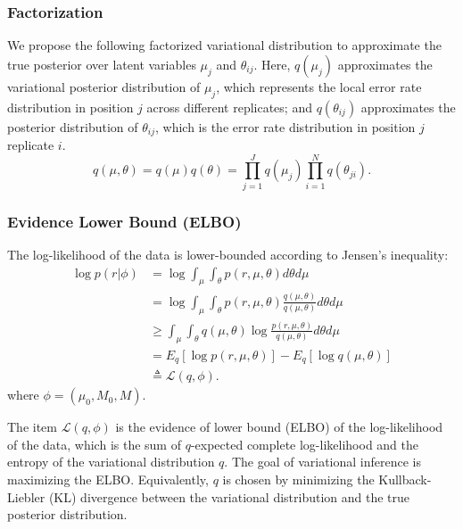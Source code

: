 \documentclass[11pt,reqno]{amsart}
\begin{document}
\subsubsection{Factorization}
We propose the following factorized variational distribution to approximate the true posterior over latent variables $\mu_j$ and $\theta_{ij}$.
Here, $q(\mu_j)$ approximates the variational posterior distribution of $\mu_j$, which represents the local error rate distribution in position $j$ across different replicates;
and $q(\theta_{ij})$ approximates the posterior distribution of $\theta_{ij}$, which is the error rate distribution in position $j$ replicate $i$.
\begin{equation}
  q(\mu, \theta) = q(\mu)q(\theta) = \prod_{j=1}^J q(\mu_{j}) \prod_{i=1}^N q(\theta_{ji}).
  \label{eq:vardist}
\end{equation}

\subsubsection{Evidence Lower Bound (ELBO)}
The log-likelihood of the data is lower-bounded according to Jensen's inequality:
\begin{equation}
\begin{split}
\log p \left( r | \phi \right) &= \log \int_\mu \int_\theta p\left(r,\mu,\theta \right) d\theta d\mu \\
&= \log \int_\mu \int_\theta p\left(r,\mu,\theta \right)\frac{q\left(\mu,\theta \right) }{q\left(\mu,\theta \right) } d\theta d\mu \\
&\geq \int_\mu \int_\theta q\left(\mu,\theta \right) \log \frac{ p\left(r,\mu,\theta \right)}{q\left(\mu,\theta \right)} d\theta d\mu \\
&= E_q \left[ \log p\left(r,\mu,\theta \right)\right] - E_q \left[ \log q\left(\mu,\theta \right)\right] \\
&\triangleq \mathcal{L}(q, \phi).
\end{split}
\end{equation}
where $ \phi= \left( \mu_0, M_0, M \right) $.

The item $\mathcal{L}(q, \phi)$ is the evidence of lower bound (ELBO) of the log-likelihood of the data, which is the sum of $q$-expected complete log-likelihood and the entropy of the variational distribution $q$.
The goal of variational inference is maximizing the ELBO.
Equivalently, $q$ is chosen by minimizing the Kullback-Liebler (KL) divergence between the variational distribution and the true posterior distribution.
\end{document}
